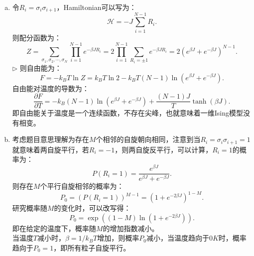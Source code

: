 \documentclass[reqno,a4paper,12pt]{amsart}
\begin{document}
\begin{enumerate}[1.]
\begin{tcolorbox}[breakable, colframe = black, colback = black!5!white]
\begin{enumerate}[(a)]
\item 令$R_i = \sigma_i \sigma_{i+1}$，Hamiltonian可以写为：
\[
	\mathcal{H} = -J\sum_{i=1}^{N-1} R_i.
\]
则配分函数为：
\[
	Z = \sum_{\sigma_1,\sigma_2,\cdots,\sigma_N} \prod_{i=1}^{N-1} e^{-\beta JR_i} = 2\prod_{i=1}^{N-1} \sum_{R_i=\pm1} e^{-\beta JR_i} = 2(e^{\beta J} + e^{-\beta J})^{N-1}.
\]
$\triangleright$ 则自由能为：
\[
	F = -k_BT \ln Z = k_BT\ln2 - k_BT(N-1)\ln(e^{\beta J} + e^{-\beta J}).
\]
自由能对温度的导数为：
\[
	\frac{\partial F}{\partial T} = -k_B(N-1)\ln(e^{\beta J} + e^{-\beta J}) + \frac{(N-1)J}{T}\tanh(\beta J).
\]
即自由能关于温度是一个连续函数，不存在尖峰，也就意味着一维Ising模型没有相变。

\item 考虑题目意思理解为存在$M$个相邻的自旋朝向相同，注意到当$R_i = \sigma_i\sigma_{i+1} = 1$就意味着两自旋平行，若$R_i=-1$，则两自旋反平行，可以计算，$R_i = 1$的概率为：
\[
	P(R_i = 1) = \frac{e^{\beta J}}{e^{\beta J} + e^{-\beta J}}.
\]
则存在$M$个平行自旋相邻的概率为：
\[
	P_0 = (P(R_i=1))^{M-1} = (1+e^{-2\beta J})^{1-M}.
\]
研究概率随$M$的变化时，可以改写得：
\[
	P_0 = \exp((1-M)\ln(1+e^{-2\beta J})).
\]
即在给定的温度下，概率随$M$的增加指数减小。 \\
当温度$T$减小时，$\beta = 1/k_BT$增加，则概率$P_0$减小，当温度趋向于$0K$时，概率趋向于$P_0 = 1$，即所有粒子自旋平行。
\end{enumerate}
\end{tcolorbox}


\end{enumerate}
\end{document}
